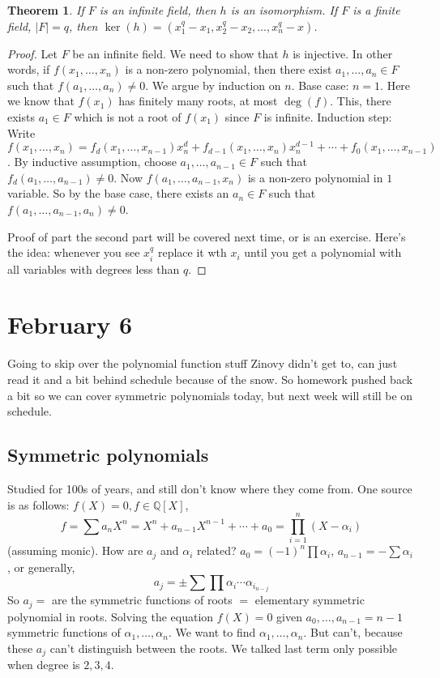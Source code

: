 \documentclass{article}
\theoremstyle{plain}
\newtheorem{theorem}{Theorem}
\theoremstyle{remark}
\newcommand{\Q}{{\mathbb Q}}
\begin{document}
\begin{theorem}
	If $F$ is an infinite field, then $h$ is an isomorphism.
	If $F$ is a finite field, $|F| = q$,
	then $\ker(h) = (x_1^q-x_1, x_2^q-x_2,\dots,x_n^q-x)$.
\end{theorem}
\begin{proof}
	Let $F$ be an infinite field.
	We need to show that $h$ is injective.
	In other words, if $f(x_1,\dots,x_n)$ is a non-zero polynomial,
	then there exist $a_1,\dots,a_n \in F$ such that $f(a_1,\dots,a_n) \neq 0$.
	We argue by induction on $n$.
	Base case: $n = 1$. Here we know that $f(x_1)$ has finitely many roots,
	at most $\deg(f)$.
	This, there exists $a_1 \in F$ which is not a root of $f(x_1)$ since $F$ is infinite.
	Induction step: Write $f(x_1,\dots,x_n) = f_d(x_1,\dots,x_{n-1})x^d_n
	+ f_{d-1}(x_1,\dots,x_n)x_n^{d-1} + \cdots + f_0(x_1,\dots,x_{n-1})$.
	By inductive assumption, choose $a_1,\dots,a_{n-1} \in F$ such that
	$f_d(a_1,\dots,a_{n-1}) \neq 0$.
	Now $f(a_1,\dots,a_{n-1},x_n)$ is a non-zero polynomial in $1$ variable.
	So by the base case, there exists an $a_n \in F$ such that
	$f(a_1,\dots,a_{n-1},a_n) \neq 0$.

	Proof of part the second part will be covered next time, or is an exercise.
	Here's the idea: whenever you see $x_i^q$ replace it wth $x_i$
	until you get a polynomial with all variables with degrees less than $q$.
\end{proof}

\section{February 6}
Going to skip over the polynomial function stuff Zinovy didn't get to,
can just read it and a bit behind schedule because of the snow.
So homework pushed back a bit so we can cover symmetric polynomials today,
but next week will still be on schedule.
\subsection{Symmetric polynomials}
Studied for 100s of years, and still don't know where they come from.
One source is as follows:
$f(X) = 0, f \in \Q[X]$,
\[
	f = \sum a_nX^n = X^n + a_{n-1}X^{n-1} + \cdots + a_0
	= \prod_{i=1}^n (X - \alpha_i)
\]
(assuming monic).
How are $a_j$ and $\alpha_i$ related?
$a_0 = (-1)^n \prod \alpha_i$,
$a_{n-1} = -\sum \alpha_i$,
or generally,
\[
	a_j = \pm \sum \prod \alpha_i \cdots \alpha_{i_{n-j}}
\]
So $a_j = $ are the symmetric functions of roots $=$
elementary symmetric polynomial in roots.
Solving the equation $f(X) = 0$ given $a_0,\dots,a_{n-1} = n-1$
symmetric functions of $\alpha_1,\dots,\alpha_n$.
We want to find $\alpha_1,\dots,\alpha_n$.
But can't, because these $a_j$ can't distinguish between the roots.
We talked last term only possible when degree is $2,3,4$.
\end{document}
